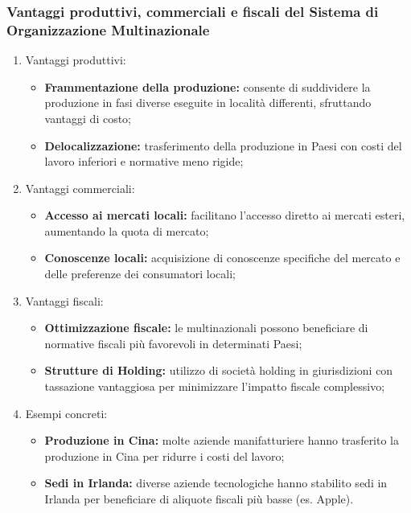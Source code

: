 \documentclass{article}
\begin{document}
\subsubsection{Vantaggi produttivi, commerciali e fiscali del Sistema di Organizzazione Multinazionale}
\begin{enumerate}
    \item Vantaggi produttivi:
        \begin{itemize}
            \item \textbf{Frammentazione della produzione:} consente di suddividere la produzione
                in fasi diverse eseguite in località differenti, sfruttando vantaggi di costo;
            \item \textbf{Delocalizzazione:} trasferimento della produzione in Paesi con costi
                del lavoro inferiori e normative meno rigide;
        \end{itemize}
    \item Vantaggi commerciali:
        \begin{itemize}
            \item \textbf{Accesso ai mercati locali:} facilitano l'accesso diretto ai mercati
                esteri, aumentando la quota di mercato;
            \item \textbf{Conoscenze locali:} acquisizione di conoscenze specifiche del
                mercato e delle preferenze dei consumatori locali;
        \end{itemize}
    \item Vantaggi fiscali:
        \begin{itemize}
            \item \textbf{Ottimizzazione fiscale:} le multinazionali possono beneficiare di
                normative fiscali più favorevoli in determinati Paesi;
            \item \textbf{Strutture di Holding:} utilizzo di società holding in giurisdizioni
                con tassazione vantaggiosa per minimizzare l'impatto fiscale complessivo;
        \end{itemize}
    \item Esempi concreti:
        \begin{itemize}
            \item \textbf{Produzione in Cina:} molte aziende manifatturiere hanno trasferito
                la produzione in Cina per ridurre i costi del lavoro;
            \item \textbf{Sedi in Irlanda:} diverse aziende tecnologiche hanno stabilito sedi
                in Irlanda per beneficiare di aliquote fiscali più basse (es. Apple).
        \end{itemize}
\end{enumerate}
\end{document}

